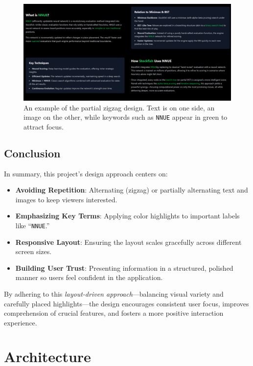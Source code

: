 \documentclass[12pt,a4paper]{article}
\begin{document}
\begin{figure}[H]
    \centering
    \includegraphics[scale=0.35]{figures/zigzag_interface.png}
    \caption{An example of the partial zigzag design. 
    Text is on one side, an image on the other, while 
    keywords such as \texttt{NNUE} appear in green 
    to attract focus.}
    \label{fig:design_screenshot}
\end{figure}

\subsection{Conclusion}
In summary, this project’s design approach centers on:
\begin{itemize}
    \item \textbf{Avoiding Repetition}: Alternating (zigzag) 
    or partially alternating text and images to keep viewers interested.
    \item \textbf{Emphasizing Key Terms}: Applying color highlights to 
    important labels like “\texttt{NNUE}.”
    \item \textbf{Responsive Layout}: Ensuring the layout scales gracefully 
    across different screen sizes.
    \item \textbf{Building User Trust}: Presenting information 
    in a structured, polished manner so users feel confident 
    in the application.
\end{itemize}

By adhering to this \emph{layout-driven approach}—balancing 
visual variety and carefully placed highlights—the design 
encourages consistent user focus, improves comprehension 
of crucial features, and fosters a more positive interaction experience.



\section{Architecture}
\label{sec:architecture}
\end{document}
